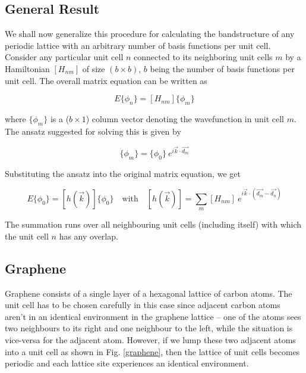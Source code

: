 \subsection{General Result}

We shall now generalize this procedure for calculating the bandstructure of any periodic lattice with an arbitrary number of basis functions per unit cell. Consider any particular unit cell $n$ connected to its neighboring unit cells $m$ by a Hamiltonian $[H_{nm}]$ of size $(b \times b)$, $b$ being the number of basis functions per unit cell. The overall matrix equation can be written as 

\begin{equation*}
     E\{\phi_{n}\} = [H_{nm}]\{\phi_{m}\}
\end{equation*} 

where $\{\phi_{m}\}$ is a ($b \times 1$) column vector denoting the wavefunction in unit cell $m$. The ansatz suggested for solving this is given by 

\begin{equation*}
    \{\phi_{m}\} = \{\phi_{0}\}\: e^{i\vec{k}\cdot\vec{d_{m}}}
\end{equation*}

Substituting the ansatz into the original matrix equation, we get

\begin{equation*}
    E\{\phi_{0}\} = [h(\vec{k})]\{\phi_{0}\} \quad \text{with} \quad [h(\vec{k})] = \sum_{m}[H_{nm}]\: e^{i\vec{k}\cdot(\vec{d_m}-\vec{d_n})}
\end{equation*}

The summation runs over all neighbouring unit cells (including itself) with which the unit cell $n$ has any overlap.


\subsection{Graphene}

Graphene consists of a single layer of a hexagonal lattice of carbon atoms. The unit cell has to be chosen carefully in this case since adjacent carbon atoms aren't in an identical environment in the graphene lattice -- one of the atoms sees two neighbours to its right and one neighbour to the left, while the situation is vice-versa for the adjacent atom. However, if we lump these two adjacent atoms into a unit cell as shown in Fig. \ref{graphene}, then the lattice of unit cells becomes periodic and each lattice site experiences an identical environment. 

